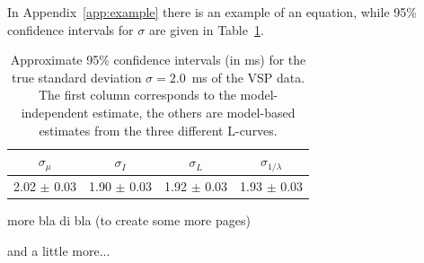 In Appendix~\ref{app:example} there is an example of an equation,
while 95\% confidence intervals for $\sigma$ are given in
Table~\ref{table:sigma}.
\begin{table} 
  \begin{center} 
    \begin{tabular}{|c|c|c|c|}\hline 
      $\sigma_\mu$  & $\sigma_I$ &$\sigma_{L}$  &$\sigma_{1/\lambda}$  \\
      \hline  
      2.02 $\pm$ 0.03 & 1.90 $\pm$ 0.03  & 1.92 $\pm$ 0.03 & 1.93 $\pm$ 0.03 
      \\ \hline 
    \end{tabular} 
    \caption{Approximate 95\% confidence intervals (in ms) for the true 
      standard deviation $\sigma=2.0$~ms of the VSP data. 
      The first column corresponds to the model-independent estimate, 
      the others are model-based estimates from the three different L-curves.}
    \label{table:sigma} 
  \end{center} 
\end{table} 

\newpage
more bla di bla (to create some more pages)

\newpage 
and a little more...


